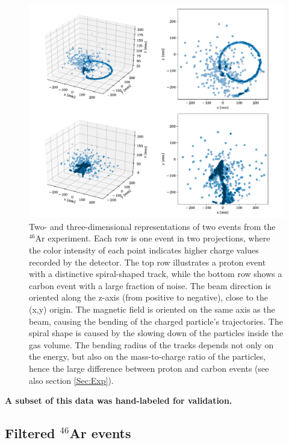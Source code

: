 \documentclass[review,sort&compress]{elsarticle}
\begin{document}
\begin{figure}[ht]
\centering
\includegraphics[width=\textwidth]{custom_work/examples_raw.pdf}
\caption[Displaying unfiltered events in two and three dimensions]{Two- and three-dimensional representations of two events from the ${}^{46}$Ar experiment. Each row is one event in two projections, where the color intensity of each point indicates higher charge values recorded by the detector. The top row illustrates a proton event with a distinctive spiral-shaped track, while the bottom row shows a carbon event with a large fraction of noise. The beam direction is oriented along the z-axis (from positive to negative), close to the (x,y) origin. The magnetic field is oriented on the same axis as the beam, causing the bending of the charged particle's trajectories. The spiral shape is caused by the slowing down of the particles inside the gas volume. The bending radius of the tracks depends not only on the energy, but also on the mass-to-charge ratio of the particles, hence the large difference between proton and carbon events (see also section \ref{Sec:Exp}).}
\label{fig:samples}
\end{figure}

{\bf A subset of this data was hand-labeled for validation.}
\subsection{Filtered \texorpdfstring{${}^{46}$Ar}{46Ar} events}\label{sec:filtered}
\end{document}
